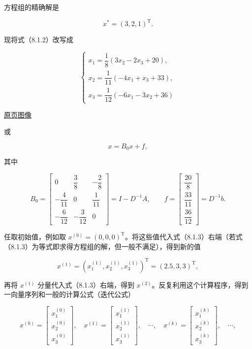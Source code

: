 \documentclass[
  10pt,
  fontset=fandol]{ctexart}
\begin{document}
方程组的精确解是

\[
x^*=(3,2,1)^{\mathrm T}.
\]

现将式（8.1.2）改写成

\[
\begin{cases}
x_1=\dfrac18(3x_2-2x_3+20),\\[4pt]
x_2=\dfrac1{11}(-4x_1+x_3+33),\\[4pt]
x_3=\dfrac1{12}(-6x_1-3x_2+36)
\end{cases}
\tag{8.1.3}
\]

\href{../../source-images/pdf-216.jpeg}{原页图像}

或

\[
x=B_0x+f,
\]

其中

\[
B_0=\begin{bmatrix}
0&\dfrac38&-\dfrac28\\[4pt]
-\dfrac4{11}&0&\dfrac1{11}\\[4pt]
-\dfrac6{12}&-\dfrac3{12}&0
\end{bmatrix}=I-D^{-1}A,\qquad
f=\begin{bmatrix}\dfrac{20}8\\[4pt]\dfrac{33}{11}\\[4pt]\dfrac{36}{12}\end{bmatrix}=D^{-1}b.
\]

任取初始值，例如取 \(x^{(0)}=(0,0,0)^{\mathrm T}\)。将这些值代入式（8.1.3）右端（若式（8.1.3）为等式即求得方程组的解，但一般不满足），得到新的值

\[
x^{(1)}=(x_1^{(1)},x_2^{(1)},x_3^{(1)})^{\mathrm T}=(2.5,3,3)^{\mathrm T},
\]

再将 \(x^{(1)}\) 分量代入式（8.1.3）右端，得到 \(x^{(2)}\)。反复利用这个计算程序，得到一向量序列和一般的计算公式（迭代公式）

\[
x^{(0)}=\begin{bmatrix}x_1^{(0)}\\x_2^{(0)}\\x_3^{(0)}\end{bmatrix},\quad
x^{(1)}=\begin{bmatrix}x_1^{(1)}\\x_2^{(1)}\\x_3^{(1)}\end{bmatrix},\quad\cdots,\quad
x^{(k)}=\begin{bmatrix}x_1^{(k)}\\x_2^{(k)}\\x_3^{(k)}\end{bmatrix},\quad\cdots,
\]
\end{document}
